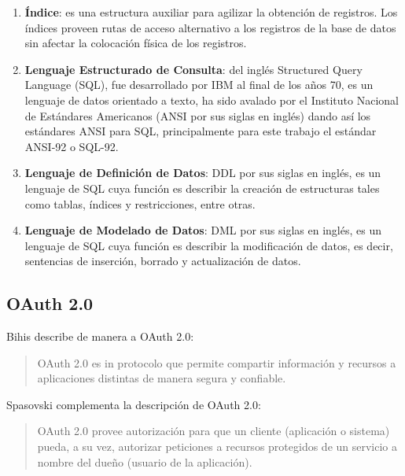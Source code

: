 \begin{enumerate}
\begin{enumerate}
	\end{enumerate}
	\item \textbf{Índice}: es una estructura auxiliar para agilizar la obtención de registros. Los índices proveen rutas de acceso alternativo a los registros de la base de datos sin afectar la colocación física de los registros\cite{FundamentalsOfDBSystems}.
	\item \textbf{Lenguaje Estructurado de Consulta}\label{sec-sql}: del inglés Structured Query Language (SQL), fue desarrollado por IBM\textsuperscript{\textcopyright} al final de los años 70, es un lenguaje de datos orientado a texto, ha sido avalado por el Instituto Nacional de Estándares Americanos (ANSI por sus siglas en inglés) dando así los estándares ANSI para SQL, principalmente para este trabajo el estándar ANSI-92 o SQL-92.
	\item \textbf{Lenguaje de Definición de Datos}: DDL por sus siglas en inglés, es un lenguaje de SQL cuya función es describir la creación de estructuras tales como tablas, índices y restricciones, entre otras\cite{DataBaseConcepts}.
	\item \textbf{Lenguaje de Modelado de Datos}: DML por sus siglas en inglés, es un lenguaje de SQL cuya función es describir la modificación de datos, es decir, sentencias de inserción, borrado y actualización de datos\cite{DataBaseConcepts}.  
\end{enumerate}

\subsection{OAuth 2.0}\label{sec-oauth}
Bihis\cite{MasteringOAuth2} describe de manera a OAuth 2.0:
\begin{quote}
	OAuth 2.0 es in protocolo que permite compartir información y recursos a aplicaciones distintas de manera segura y confiable.
\end{quote}

Spasovski\cite{OAuth2Identity} complementa la descripción de OAuth 2.0:
\begin{quote}
	OAuth 2.0 provee autorización para que un cliente (aplicación o sistema) pueda, a su vez, autorizar peticiones a recursos protegidos de un servicio a nombre del dueño (usuario de la aplicación).
\end{quote}

